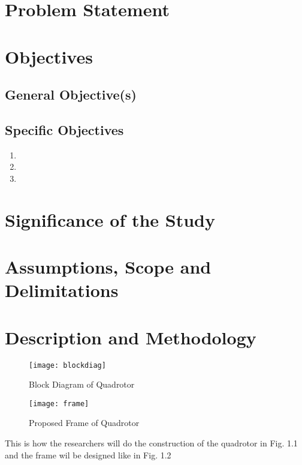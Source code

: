 \section{Problem Statement}

\section{Objectives}

\subsection{General Objective(s)}


\subsection{Specific Objectives}
\begin{enumerate}
\item 

\item 

\item 

\end{enumerate}



\section{Significance of the Study}




\section{Assumptions, Scope and Delimitations}



\section{Description and Methodology \documentType}



\begin{figure}[ht]
	\centering
	\texttt{[image: blockdiag]}
	\caption{Block Diagram of Quadrotor}
\end{figure}




\begin{figure}[ht]
	\centering
	\texttt{[image: frame]}
	\caption{Proposed Frame of Quadrotor}
\end{figure}
This is how the researchers will do the construction of the quadrotor in Fig. 1.1 and the frame wil be designed like in Fig. 1.2
\ifFinished
\else
\newpage
